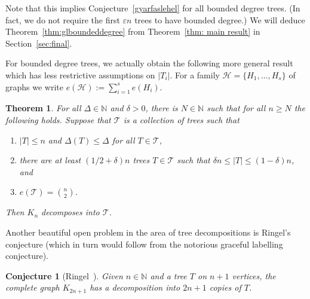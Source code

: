 \documentclass[a4paper, 11pt, reqno]{amsart}
\newtheorem{theorem}[definition]{Theorem}
\newtheorem{conjecture}[definition]{Conjecture}
\numberwithin{equation}{section}
\newcommand{\1}{{\rm 1\hspace*{-0.4ex}%
\rule{0.1ex}{1.52ex}\hspace*{0.2ex}}}
\newcommand{\N}{\mathbb N}
\newcommand{\cT}{\mathcal{T}}
\newcommand{\cH}{\mathcal{H}}
\renewcommand{\epsilon}{\varepsilon}
\newcommand{\COMMENT}[1]{}
\begin{document}
Note that this implies Conjecture~\ref{gyarfaslehel} for all bounded degree trees. 
(In fact, we do not require the first $\epsilon n$ trees to have bounded degree.)
We will deduce Theorem~\ref{thm:glboundeddegree} from Theorem~\ref{thm: main result} in Section~\ref{sec:final}.


For bounded degree trees, 
we actually obtain the following more general result which has less restrictive assumptions on $|T_i|$.
For a family $\cH=\{H_1,\ldots,H_s\}$ of graphs we write $e(\cH):=\sum_{i=1}^se(H_i)$.

\begin{theorem}\label{thm:main simple}
For all $\Delta\in \N$ and $\delta>0$, there is $N\in \N$
such that for all $n\geq N$ the following holds.
Suppose that $\cT$ is a collection of trees such that
\begin{enumerate}[label=(\roman*)]
	\item $|T|\leq n$ and $\Delta(T)\leq \Delta$ for all $T\in \cT$,
	\item there are at least $(1/2 + \delta)n$ trees $T\in \cT$ such that $\delta n\leq |T|\leq (1-\delta)n$, and
	\item $e(\cT)= \binom{n}{2}$.
\end{enumerate}
Then $K_n$ decomposes into $\cT$.
\end{theorem}

Another beautiful open problem in the area of tree decompositions is Ringel's conjecture (which in turn would follow from the notorious graceful labelling conjecture).

\begin{conjecture}[Ringel~\cite{Rin63}] \label{ringel}
Given $n\in\N$ and a tree $T$ on $n+1$ vertices, the complete graph $K_{2n+1}$ has a decomposition into $2n+1$ copies of $T$. 
\end{conjecture}\COMMENT{
Here, $2n$ is best possible for stars. If we have $K_{m}$ with $m\leq 2n-1$, any packing leaves at least two vertices of the clique which is never in the image of a star centre. Then edge between them cannot be covered.

If graceful labelling conjecture is true, then for any tree $T$ on $n+1$ vertices, the complete graph $K_{2n}$ has a decomposition into $2n-1$ copies of $T$.
To see this, take a leaf $\ell$ of $T$ and a vertex $x$ which is the neighbour of $\ell$, and consider $T'=T-\ell$. Since $T'$ has $n$ vertices, by using graceful labelling conjecture, $K_{2n-1}$ has a decomposition of into $2n-1$ copies of $T'$. Moreover, we also have the following : 
when $V(K_{2n-1})= [2n-1]$, there are embeddings $\phi_i: T' \rightarrow [2n-1]$ for $i\in [2n-1]$ such that $\phi_i(x)= \phi_{j}(x) + j-i ~ (\mod 2n-1)$ and $\bigcup_{i=1}^{2n-1} E(\phi_i(T')) = E(K_{2n-1}).$ Since $\phi_i(x) \neq \phi_j(x)$ for $i\neq j$, for each $j'\in [2n-1]$ there exists unique $i\in [2n-1]$ such that $\phi_i(x) = j'$. Thus we let $\phi_i(\ell)= 2n$ for any $i$, then we get perfect decomposition of $K_{2n}$ into copies of $T$.
}
\end{document}
